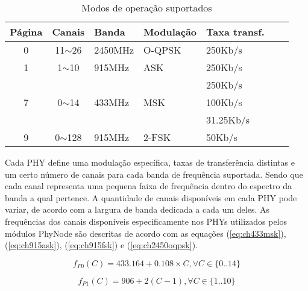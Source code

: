 \documentclass{article}
\begin{document}
	\begin{table}[h]
		\centering
		\begin{tabular}{|c|c|l|l|l|l|l|}
			\hline
			\textbf{Página}    & \multicolumn{1}{l|}{\textbf{Canais}}   & \textbf{Banda}          & \textbf{Modulação}   & \textbf{Taxa transf.} \\ \hline
			0                  & 11$\sim$26                             & 2450MHz                 & O-QPSK               & 250Kb/s               \\ \hline
			1                  & 1$\sim$10                              & 915MHz                  & ASK                  & 250Kb/s               \\ \hline
			\multirow{3}{*}{7} & \multirow{3}{*}{0$\sim$14}             & \multirow{3}{*}{433MHz} & \multirow{3}{*}{MSK} & 250Kb/s               \\
		                       &                                        &                         &                      & 100Kb/s               \\
			                   &                                        &                         &                      & 31.25Kb/s             \\ \hline
			9                  & 0$\sim$128                             & 915MHz                  & 2-FSK                & 50Kb/s                \\ \hline 
		\end{tabular}
		\caption{Modos de operação suportados}
		\label{tab:modos_opr}
	\end{table}
	
	Cada PHY define uma modulação específica, taxas de transferência distintas e um certo número de canais para cada banda de frequência suportada. Sendo que cada canal representa uma pequena faixa de frequência dentro do espectro da banda a qual pertence. A quantidade de canais disponíveis em cada PHY pode variar, de acordo com a largura de banda dedicada a cada um deles. As frequências dos canais disponíveis especificamente nos PHYs utilizados pelos módulos PhyNode são  descritas de acordo com as equações (\ref{eq:ch433msk}), (\ref{eq:ch915ask}), (\ref{eq:ch915fsk}) e (\ref{eq:ch2450oqpsk}).
	
	\begin{equation}
		\label{eq:ch433msk}
		f_{P0}(C) = 433.164 + 0.108\times C, \forall C \in \{0..14\}
	\end{equation}
	
	\begin{equation}
		\label{eq:ch915ask}
		f_{P1}(C) = 906 + 2 (C - 1), \forall C \in \{1..10\}
	\end{equation}
	
\end{document}

